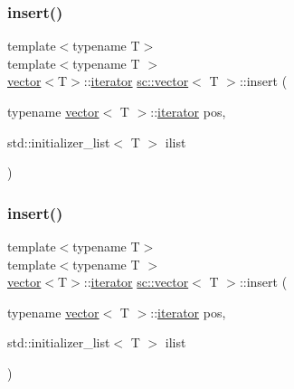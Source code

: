 \subsubsection{\texorpdfstring{insert()}{insert()}\hspace{0.1cm}{\footnotesize\ttfamily [8/9]}}
{\footnotesize\ttfamily template$<$typename T$>$ \\
template$<$typename T $>$ \\
\mbox{\hyperlink{classsc_1_1vector}{vector}}$<$T$>$\+::\mbox{\hyperlink{classsc_1_1vector_1_1iterator}{iterator}} \mbox{\hyperlink{classsc_1_1vector}{sc\+::vector}}$<$ T $>$\+::insert (\begin{DoxyParamCaption}\item[{typename \mbox{\hyperlink{classsc_1_1vector}{vector}}$<$ T $>$\+::\mbox{\hyperlink{classsc_1_1vector_1_1iterator}{iterator}}}]{pos,  }\item[{std\+::initializer\+\_\+list$<$ T $>$}]{ilist }\end{DoxyParamCaption})}

\mbox{\label{classsc_1_1vector_a4e59b7f5bc99a5436397426626719251}} 
\subsubsection{\texorpdfstring{insert()}{insert()}\hspace{0.1cm}{\footnotesize\ttfamily [9/9]}}
{\footnotesize\ttfamily template$<$typename T$>$ \\
template$<$typename T $>$ \\
\mbox{\hyperlink{classsc_1_1vector}{vector}}$<$T$>$\+::\mbox{\hyperlink{classsc_1_1vector_1_1iterator}{iterator}} \mbox{\hyperlink{classsc_1_1vector}{sc\+::vector}}$<$ T $>$\+::insert (\begin{DoxyParamCaption}\item[{typename \mbox{\hyperlink{classsc_1_1vector}{vector}}$<$ T $>$\+::\mbox{\hyperlink{classsc_1_1vector_1_1iterator}{iterator}}}]{pos,  }\item[{std\+::initializer\+\_\+list$<$ T $>$}]{ilist }\end{DoxyParamCaption})}

\mbox{\label{classsc_1_1vector_a22ba85b963cc80ec631017a5460ea393}} 
